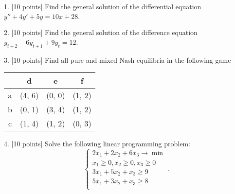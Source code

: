 \documentclass[12pt,a4paper]{article}
\begin{document}
\newpage
{}


 1.  {[10 points]} Find the general solution of the differential equation $y'' + 4y' + 5y = 10x+28$.

 
 \newpage
{}

  2.  {[10 points]}  Find the general solution of the difference equation $y_{t+2} - 6y_{t+1} + 9y_t = 12$.

\newpage
{}

  3. {[10 points]} Find all pure and mixed Nash equilibria in the following game

\begin{center}
\begin{tabular}{@{}cccc@{}}
\toprule
  & d & e & f \\ \midrule
a & (4, 6) & (0, 0)  & (1, 2)   \\
b & (0, 1) & (3, 4) & (1, 2)   \\
c & (1, 4) & (1, 2) & (0, 3)   \\ \bottomrule
\end{tabular}
\end{center}

\newpage
{}

4. {[10 points]} Solve the following linear programming problem:
\[
\begin{cases}
2x_1 + 2x_2 + 6x_3 \to \min \\
x_1 \geq 0, x_2 \geq 0, x_3 \geq 0 \\
3x_1 + 5x_2 + x_3 \geq 9 \\
5x_1 + 3x_2 + x_3 \geq 8 \\
\end{cases}.
\]
\end{document}
